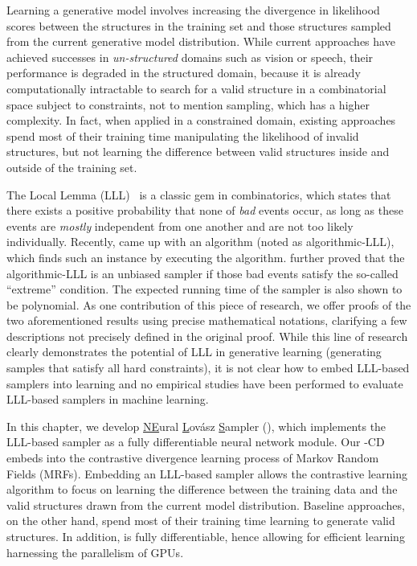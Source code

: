 Learning a generative model involves increasing the divergence in likelihood
scores between the structures in the training set and those structures sampled
from the current generative model distribution.
%
While current approaches have achieved successes in \textit{un-structured}
domains such as vision or speech, their performance is degraded in the
structured domain, because it is already computationally intractable to search
for a valid structure in a combinatorial space subject to constraints, not to
mention sampling, which has a higher complexity.
%
%
%
In fact, when applied in a constrained domain, existing approaches spend most
of their training time manipulating the likelihood of invalid structures, but
not learning the difference between valid structures inside and outside of the
training set.
%

The \lovasz Local Lemma (LLL)~\citep{erdHos1973problems} is a classic gem in
combinatorics, which states that there exists a positive probability that none
of \textit{bad} events occur, as long as these events are \textit{mostly}
independent from one another and are not too likely individually.
%
Recently, \citep{DBLP:journals/jacm/MoserT10} came up with an algorithm (noted
as algorithmic-LLL), which finds such an instance by executing the algorithm.
%
\citep{DBLP:journals/jacm/GuoJL19} further proved that the algorithmic-LLL is an unbiased sampler if those bad events satisfy the so-called ``extreme'' condition.
The expected running time of the sampler is also shown to be polynomial.
%
As one contribution of this piece of research, we offer proofs of the two
aforementioned results using precise mathematical notations, clarifying a few
descriptions not precisely defined in the original proof.
%
While this line of research clearly demonstrates the potential of LLL in
generative learning (generating samples that satisfy all hard constraints), it
is not clear how to embed LLL-based samplers into learning and no empirical
studies have been performed to evaluate LLL-based samplers in machine learning.

In this chapter, we develop \underline{NE}ural \underline{L}ov\'asz
\underline{S}ampler (\nls), which implements the LLL-based sampler as a fully
differentiable neural network module.
%
Our \nls-CD embeds \nls into the contrastive divergence learning process of
Markov Random Fields (MRFs).
%
%
%
Embedding an LLL-based sampler allows the contrastive learning algorithm to
focus on learning the difference between the training data and the valid
structures drawn from the current model distribution. Baseline approaches, on
the other hand, spend most of their training time learning to generate valid
structures.
%
In addition, \nls is fully differentiable, hence allowing for efficient
learning harnessing the parallelism of GPUs.

